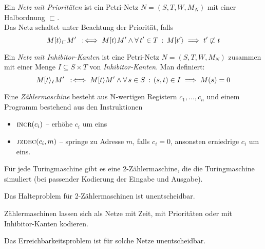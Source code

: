 \documentclass{cheat-sheet}
\newcommand{\activeTransition}[1]{[{#1}\rangle} %
\begin{document}

\begin{defn}
  Ein \emph{Netz mit Prioritäten} ist ein Petri-Netz $N = (S, T, W, M_N)$ mit einer Halbordnung ${\sqsubset}$. \\
  Das Netz schaltet unter Beachtung der Priorität, falls
  \[
    M \activeTransition{t}_{\sqsubset} M' \coloniff M \activeTransition{t} M' \wedge \fa{t' \in T} M \activeTransition{t'} \implies t' \not\sqsubset t
  \]
\end{defn}


\begin{defn}
  Ein \emph{Netz mit Inhibitor-Kanten} ist eine Petri-Netz $N = (S, T, W, M_N)$ zusammen mit einer Menge $I \subseteq S \times T$ von \textit{Inhibitor-Kanten}.
  Man definiert:
  \[
    M \activeTransition{t}_I M' \coloniff M \activeTransition{t} M' \wedge \fa{s \in S} (s, t) \in I \implies M(s) = 0
  \]
\end{defn}

\begin{defn}
  Eine \emph{Zählermaschine} besteht aus $\mathbb{N}$-wertigen Registern $c_1, \ldots, c_n$ und einem Programm bestehend aus den Instruktionen
  \begin{itemize}
    \item $\Call{incr}{c_i}$ -- erhöhe $c_i$ um eins
    \item $\Call{jzdec}{c_i, m}$ -- springe zu Adresse $m$, falls $c_i = 0$, ansonsten erniedrige $c_i$ um eins.
  \end{itemize}
\end{defn}

\begin{prop}
  Für jede Turingmaschine gibt es eine 2-Zählermaschine, die die Turingmaschine simuliert (bei passender Kodierung der Eingabe und Ausgabe).
\end{prop}

\begin{kor}
  Das Halteproblem für 2-Zählermaschinen ist unentscheidbar.
\end{kor}

\begin{lem}
  Zählermaschinen lassen sich als Netze mit Zeit, mit Prioritäten oder mit Inhibitor-Kanten kodieren.
\end{lem}

\begin{kor}
  Das Erreichbarkeitsproblem ist für solche Netze unentscheidbar.
\end{kor}
\end{document}
